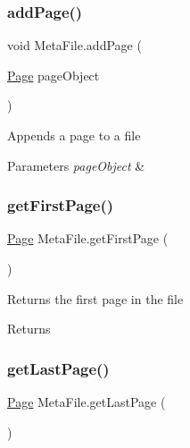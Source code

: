 \subsubsection{\texorpdfstring{add\+Page()}{addPage()}}
{\footnotesize\ttfamily void Meta\+File.\+add\+Page (\begin{DoxyParamCaption}\item[{\mbox{\hyperlink{class_page}{Page}}}]{page\+Object }\end{DoxyParamCaption})\hspace{0.3cm}{\ttfamily [inline]}}

Appends a page to a file 
\begin{DoxyParams}{Parameters}
{\em page\+Object} & \\
\hline
\end{DoxyParams}
\mbox{\label{class_meta_file_a495f8b327a312ebcdd54e7dbfdd98ee5}} 
\subsubsection{\texorpdfstring{get\+First\+Page()}{getFirstPage()}}
{\footnotesize\ttfamily \mbox{\hyperlink{class_page}{Page}} Meta\+File.\+get\+First\+Page (\begin{DoxyParamCaption}{ }\end{DoxyParamCaption})\hspace{0.3cm}{\ttfamily [inline]}}

Returns the first page in the file \begin{DoxyReturn}{Returns}

\end{DoxyReturn}
\mbox{\label{class_meta_file_adf3ad8347572a056d3a7ae730c120303}} 
\subsubsection{\texorpdfstring{get\+Last\+Page()}{getLastPage()}}
{\footnotesize\ttfamily \mbox{\hyperlink{class_page}{Page}} Meta\+File.\+get\+Last\+Page (\begin{DoxyParamCaption}{ }\end{DoxyParamCaption})\hspace{0.3cm}{\ttfamily [inline]}}

